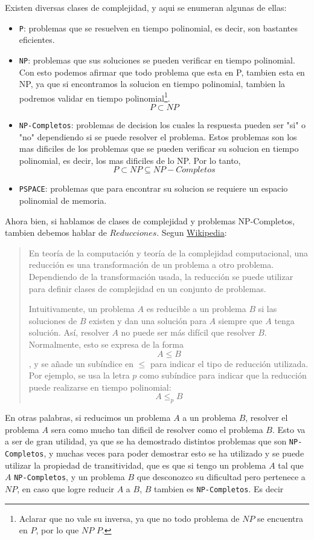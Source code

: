 Existen diversas clases de complejidad, y aqui se enumeran algunas de ellas:
\begin{itemize}
	\item \texttt{P}: problemas que se resuelven en tiempo polinomial, es decir, son bastantes eficientes.
	\item \texttt{NP}: problemas que sus soluciones se pueden verificar en tiempo polinomial. Con esto podemos afirmar que todo problema que esta en P, tambien esta en NP, ya que si encontramos la solucion en tiempo polinomial, tambien la podremos validar en tiempo polinomial\footnote{Aclarar que no vale su inversa, ya que no todo problema de $NP$ se encuentra en $P$, por lo que $NP$ \not\subset  $P$.}.
    \[ P \subset NP\]
	\item \texttt{NP-Completos}: problemas de decision los cuales la respuesta pueden ser "si" o "no" dependiendo si se puede resolver el problema. Estos problemas son los mas dificiles de los problemas que se pueden verificar su solucion en tiempo polinomial, es decir, los mas dificiles de lo NP.
    Por lo tanto,
    \[ P \subset NP \subseteq NP-Completos\]
	\item \texttt{PSPACE}: problemas que para encontrar su solucion se requiere un espacio polinomial de memoria.
\end{itemize}
Ahora bien, si hablamos de clases de complejidad y problemas NP-Completos, tambien debemos hablar de $Reducciones$. Segun \href{https://es.wikipedia.org/wiki/Reducci%C3%B3n_(complejidad)}{Wikipedia}:
\begin{quote}
    En teoría de la computación y teoría de la complejidad computacional, una reducción es una transformación de un problema a otro problema. Dependiendo de la transformación usada, la reducción se puede utilizar para definir clases de complejidad en un conjunto de problemas.

    Intuitivamente, un problema $A$ es reducible a un problema $B$ si las soluciones de $B$ existen y dan una solución para $A$ siempre que $A$ tenga solución. Así, resolver $A$ no puede ser más difícil que resolver $B$. Normalmente, esto se expresa de la forma \[A \leq B\], y se añade un subíndice en $\le$ para indicar el tipo de reducción utilizada. Por ejemplo, se usa la letra $p$ como subíndice para indicar que la reducción puede realizarse en tiempo polinomial: \[A \leq _p B\]
\end{quote}

En otras palabras, si reducimos un problema $A$ a un problema $B$, resolver el problema $A$ sera como mucho tan dificil de resolver como el problema $B$. Esto va a ser de gran utilidad, ya que se ha demostrado distintos problemas que son \texttt{NP-Completos}, y muchas veces para poder demostrar esto se ha utilizado y se puede utilizar la propiedad de transitividad, que es que si tengo un problema $A$ tal que $A$ \in \texttt{NP-Completos}, y un problema $B$ que desconozco su dificultad pero pertenece a $NP$, en caso que logre reducir $A$ a $B$, $B$ tambien es \texttt{NP-Completos}. Es decir

